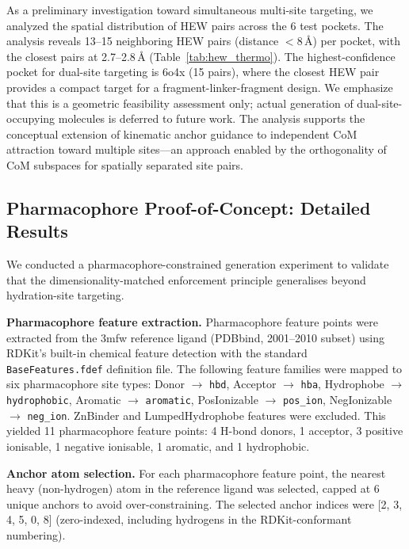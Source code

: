 \documentclass{article}
\begin{document}
As a preliminary investigation toward simultaneous multi-site targeting,
we analyzed the spatial distribution of HEW pairs across the 6 test
pockets.  The analysis reveals 13--15 neighboring HEW pairs (distance
$<8$\,\AA) per pocket, with the closest pairs at 2.7--2.8\,\AA{}
(Table~\ref{tab:hew_thermo}).  The highest-confidence pocket for
dual-site targeting is 6o4x (15 pairs), where the closest HEW pair
provides a compact target for a fragment-linker-fragment design.
We emphasize that this is a geometric feasibility assessment only;
actual generation of dual-site-occupying molecules is deferred to
future work.  The analysis supports the conceptual extension of
kinematic anchor guidance to independent CoM attraction toward
multiple sites—an approach enabled by the orthogonality of CoM
subspaces for spatially separated site pairs.

\subsection*{Pharmacophore Proof-of-Concept: Detailed Results}
\label{sec:pharm_poc_si}

We conducted a pharmacophore-constrained generation experiment to validate
that the dimensionality-matched enforcement principle generalises beyond
hydration-site targeting.

\vspace{4pt}
\noindent\textbf{Pharmacophore feature extraction.}
Pharmacophore feature points were extracted from the 3mfw reference ligand
(PDBbind, 2001--2010 subset) using RDKit's built-in chemical feature
detection with the standard \texttt{BaseFeatures.fdef} definition file.
The following feature families were mapped to six pharmacophore site types:
Donor $\to$ \texttt{hbd}, Acceptor $\to$ \texttt{hba},
Hydrophobe $\to$ \texttt{hydrophobic}, Aromatic $\to$ \texttt{aromatic},
PosIonizable $\to$ \texttt{pos\_ion}, NegIonizable $\to$ \texttt{neg\_ion}.
ZnBinder and LumpedHydrophobe features were excluded.
This yielded 11 pharmacophore feature points: 4 H-bond donors, 1 acceptor,
3 positive ionisable, 1 negative ionisable, 1 aromatic, and 1 hydrophobic.

\vspace{4pt}
\noindent\textbf{Anchor atom selection.}
For each pharmacophore feature point, the nearest heavy (non-hydrogen) atom
in the reference ligand was selected, capped at 6 unique anchors to avoid
over-constraining.  The selected anchor indices were [2, 3, 4, 5, 0, 8]
(zero-indexed, including hydrogens in the RDKit-conformant numbering).
\end{document}
